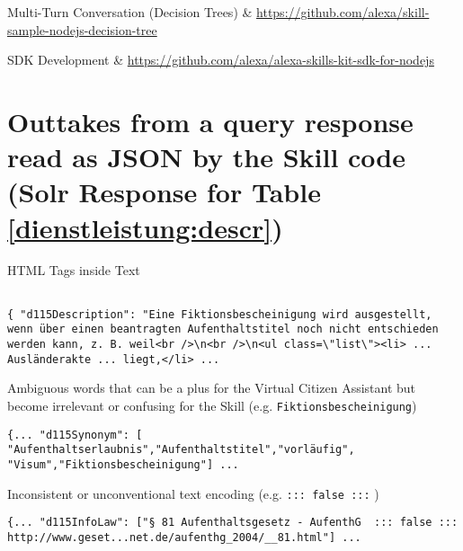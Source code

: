 \begin{flushleft}
\begin{tabu}
Multi-Turn Conversation (Decision Trees) & \url{https://github.com/alexa/skill-sample-nodejs-decision-tree}\\ \hline


SDK Development & \url{https://github.com/alexa/alexa-skills-kit-sdk-for-nodejs}\\
 \hline
	\end{tabu}
\end{flushleft}







\clearpage

\section*{Outtakes from a query response read as JSON by the Skill code (Solr Response for Table \ref{dienstleistung:descr})}
\label{query:dl}

HTML Tags inside Text
\begin{verbatim}

{ "d115Description": "Eine Fiktionsbescheinigung wird ausgestellt, wenn über einen beantragten Aufenthaltstitel noch nicht entschieden werden kann, z. B. weil<br />\n<br />\n<ul class=\"list\"><li> ... Ausländerakte ... liegt,</li> ...
\end{verbatim}

Ambiguous words that can be a plus for the Virtual Citizen Assistant but become irrelevant or confusing for the Skill (e.g. \texttt{Fiktionsbescheinigung})
\begin{verbatim}
{... "d115Synonym": [
"Aufenthaltserlaubnis","Aufenthaltstitel","vorläufig",
"Visum","Fiktionsbescheinigung"] ...
\end{verbatim}

Inconsistent or unconventional text encoding (e.g. \texttt{::: false :::} )
\begin{verbatim}
{... "d115InfoLaw": ["§ 81 Aufenthaltsgesetz - AufenthG  ::: false ::: http://www.geset...net.de/aufenthg_2004/__81.html"] ...
\end{verbatim}

